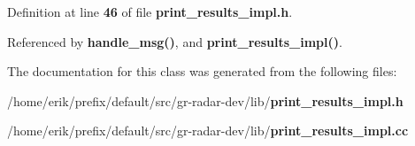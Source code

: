 Definition at line {\bf 46} of file {\bf print\+\_\+results\+\_\+impl.\+h}.



Referenced by {\bf handle\+\_\+msg()}, and {\bf print\+\_\+results\+\_\+impl()}.



The documentation for this class was generated from the following files\+:\begin{DoxyCompactItemize}
\item 
/home/erik/prefix/default/src/gr-\/radar-\/dev/lib/{\bf print\+\_\+results\+\_\+impl.\+h}\item 
/home/erik/prefix/default/src/gr-\/radar-\/dev/lib/{\bf print\+\_\+results\+\_\+impl.\+cc}\end{DoxyCompactItemize}
